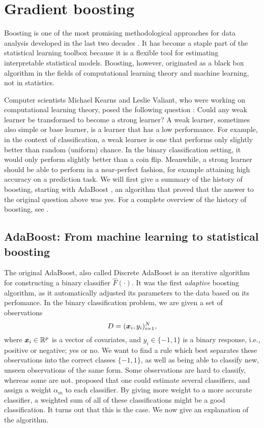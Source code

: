 \chapter{Gradient boosting}\label{ch:boosting}
Boosting is one of the most promising methodological approaches for data analysis developed in the last two decades \citep{mayr14a}.
It has become a staple part of the statistical learning toolbox because it is a flexible tool for estimating interpretable statistical models.
Boosting, however, originated as a black box algorithm in the fields of computational learning theory and machine learning, not in statistics.

Computer scientists Michael Kearns and Leslie Valiant, who were working on computational learning theory, posed the following question \citep{kearnsvaliant}: 
Could any weak learner be transformed to become a strong learner?
A weak learner, sometimes also simple or base learner, is a learner that has a low performance.
For example, in the context of classification, a weak learner is one that performs only slightly better than random (uniform) chance.
In the binary classification setting, it would only perform slightly better than a coin flip.
Meanwhile, a strong learner should be able to perform in a near-perfect fashion, for example attaining high accuracy on a prediction task.
We will first give a summary of the history of boosting, starting with AdaBoost \citep{adaboost}, an algorithm that proved that the answer to the original question above was yes.
For a complete overview of the history of boosting, see \citet{mayr14a, mayr14b, mayr17}.

\section{AdaBoost: From machine learning to statistical boosting}
The original AdaBoost, also called Discrete AdaBoost \citep{adaboost} is an iterative algorithm for constructing a binary classifier $\hat{F}(\cdot)$.
It was the first \textit{adaptive} boosting algorithm, as it automatically adjusted its parameters to the data based on its perfomance.
In the binary classification problem, we are given a set of observations
\begin{equation*}
    D=(\bm{x}_i,y_i)_{i=1}^N,
\end{equation*}
where $\bm{x}_i\in\mathbb{R}^p$ is a vector of covariates, and $y_i\in\{-1,1\}$ is a binary response, i.e., positive or negative; yes or no.
We want to find a rule which best separates these observations into the correct classes $\{-1,1\}$, as well as being able to classify new, unseen observations of the same form.
Some observations are hard to classify, whereas some are not.
\citet{adaboost} proposed that one could estimate several classifiers, and assign a weight $\alpha_m$ to each classifier.
By giving more weight to a more accurate classifier, a weighted sum of all of these classifications might be a good classification.
It turns out that this is the case.
We now give an explanation of the algorithm.

